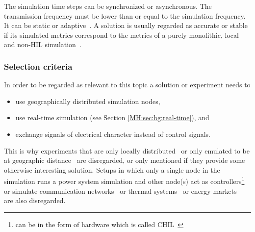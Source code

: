 \documentclass[a4paper]{atseminar}
\begin{document}
The simulation time steps can be synchronized or asynchronous.
The transmission frequency must be lower than or equal to the simulation frequency. It can be static or adaptive~\cite{vogel2019improve}.
A solution is usually regarded as accurate or stable if its simulated metrics correspond to the metrics of a purely monolithic, local and non-HIL simulation~\cite{montoya2020}.

\subsubsection{Selection criteria}
\label{MH:sec:selection}

In order to be regarded as relevant to this topic a solution or experiment needs to

\begin{itemize}

	\item use geographically distributed simulation nodes,
    \item use real-time simulation (see Section \ref{MH:sec:bg:real-time}), and
	\item exchange signals of electrical character instead of control signals.

\end{itemize}

This is why experiments that are only locally distributed~\cite{yang2013, lin-yu2012, jiang2016, ravikumar2009} or only emulated to be at geographic distance~\cite{li2017, liu2016} are disregarded, or only mentioned if they provide some otherwise interesting solution. Setups in which only a single node in the simulation runs a power system simulation and other node(s) act as controllers\footnote{can be in the form of hardware which is called CHIL~\cite{syed2020standard}}~\cite{wang2020, montoya2018, pau2018, barbierato2019} or simulate communication networks~\cite{nguyen2020} or thermal systems~\cite{faruque2009a, faruque2009b} or energy markets~\cite{vogt2019} are also disregarded.


\end{document}
